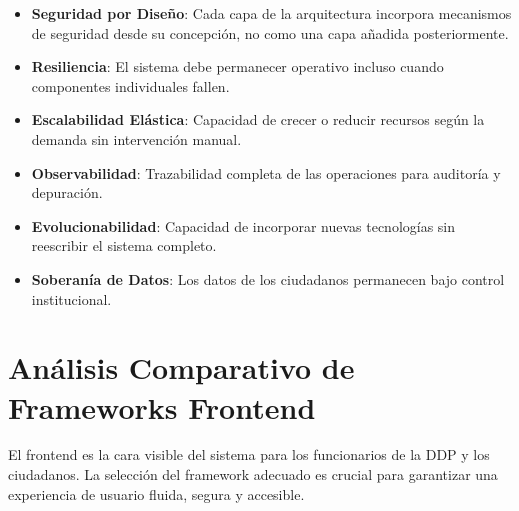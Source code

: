 \begin{itemize}
    \item \textbf{Seguridad por Diseño}: Cada capa de la arquitectura incorpora mecanismos de seguridad desde su concepción, no como una capa añadida posteriormente.
    \item \textbf{Resiliencia}: El sistema debe permanecer operativo incluso cuando componentes individuales fallen.
    \item \textbf{Escalabilidad Elástica}: Capacidad de crecer o reducir recursos según la demanda sin intervención manual.
    \item \textbf{Observabilidad}: Trazabilidad completa de las operaciones para auditoría y depuración.
    \item \textbf{Evolucionabilidad}: Capacidad de incorporar nuevas tecnologías sin reescribir el sistema completo.
    \item \textbf{Soberanía de Datos}: Los datos de los ciudadanos permanecen bajo control institucional.
\end{itemize}

\section{Análisis Comparativo de Frameworks Frontend}

El frontend es la cara visible del sistema para los funcionarios de la DDP y los ciudadanos. La selección del framework adecuado es crucial para garantizar una experiencia de usuario fluida, segura y accesible.

